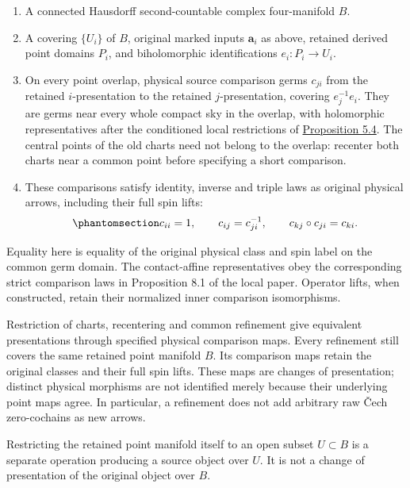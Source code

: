 \documentclass[
  english,
  11pt,
  reqno]{amsart}
\begin{document}
\begin{enumerate}
\item
  A connected Hausdorff second-countable complex four-manifold \(B\).
\item
  A covering \(\{U_i\}\) of \(B\), original marked inputs
  \(\mathbf a_i\) as above, retained derived point domains \(P_i\), and
  biholomorphic identifications \(e_i:P_i\to U_i\).
\item
  On every point overlap, physical source comparison germs \(c_{ji}\)
  from the retained \(i\)-presentation to the retained
  \(j\)-presentation, covering \(e_j^{-1}e_i\). They are germs near
  every whole compact sky in the overlap, with holomorphic
  representatives after the conditioned local restrictions of
  \hyperref[prop:source-atlas-local-analytic-execution]{Proposition
  5.4}. The central points of the old charts need not belong to the
  overlap: recenter both charts near a common point before specifying a
  short comparison.
\item
  These comparisons satisfy identity, inverse and triple laws as
  original physical arrows, including their full spin lifts:
  \begin{equation}\protect\phantomsection\label{eq:original-source-atlas-cocycle}{
  c_{ii}=1,\qquad
  c_{ij}=c_{ji}^{-1},\qquad
  c_{kj}\circ c_{ji}=c_{ki}.
  }\end{equation}
\end{enumerate}

Equality here is equality of the original physical class and spin label
on the common germ domain. The contact-affine representatives obey the
corresponding strict comparison laws in Proposition 8.1 of the local
paper. Operator lifts, when constructed, retain their normalized inner
comparison isomorphisms.

Restriction of charts, recentering and common refinement give equivalent
presentations through specified physical comparison maps. Every
refinement still covers the same retained point manifold \(B\). Its
comparison maps retain the original classes and their full spin lifts.
These maps are changes of presentation; distinct physical morphisms are
not identified merely because their underlying point maps agree. In
particular, a refinement does not add arbitrary raw Čech zero-cochains
as new arrows.

Restricting the retained point manifold itself to an open subset
\(U\subset B\) is a separate operation producing a source object over
\(U\). It is not a change of presentation of the original object over
\(B\).
\end{document}
